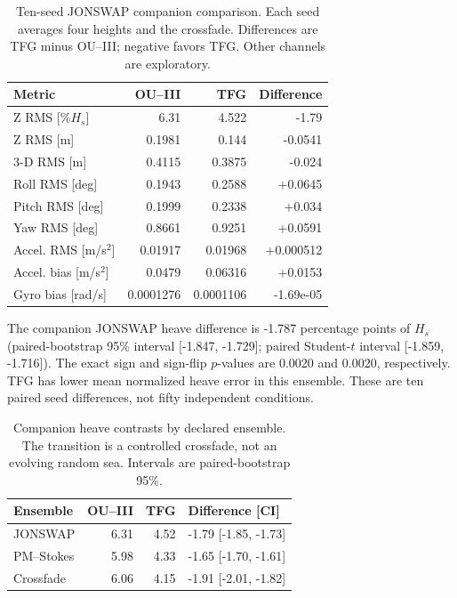 \begin{table}[t]\centering\footnotesize
\caption{Ten-seed JONSWAP companion comparison. Each seed averages four heights and the crossfade. Differences are TFG minus OU--III; negative favors TFG. Other channels are exploratory.}
\label{tab:tfg-paired}\setlength{\tabcolsep}{3pt}
\begin{tabular}{@{}lrrr@{}}\toprule
Metric & OU--III & TFG & Difference\\\midrule
Z RMS [$\%H_s$] & 6.31 & 4.522 & -1.79\\
Z RMS [m] & 0.1981 & 0.144 & -0.0541\\
3-D RMS [m] & 0.4115 & 0.3875 & -0.024\\
Roll RMS [deg] & 0.1943 & 0.2588 & +0.0645\\
Pitch RMS [deg] & 0.1999 & 0.2338 & +0.034\\
Yaw RMS [deg] & 0.8661 & 0.9251 & +0.0591\\
Accel. RMS [m/s$^2$] & 0.01917 & 0.01968 & +0.000512\\
Accel. bias [m/s$^2$] & 0.0479 & 0.06316 & +0.0153\\
Gyro bias [rad/s] & 0.0001276 & 0.0001106 & -1.69e-05\\
\bottomrule\end{tabular}\end{table}
The companion JONSWAP heave difference is -1.787 percentage points of $H_s$ (paired-bootstrap 95\% interval [-1.847, -1.729]; paired Student-$t$ interval [-1.859, -1.716]). The exact sign and sign-flip $p$-values are 0.0020 and 0.0020, respectively. TFG has lower mean normalized heave error in this ensemble.
These are ten paired seed differences, not fifty independent conditions.
\begin{table}[t]\centering\footnotesize
\caption{Companion heave contrasts by declared ensemble. The transition is a controlled crossfade, not an evolving random sea. Intervals are paired-bootstrap 95\%.}
\label{tab:tfg-ensembles}\setlength{\tabcolsep}{3pt}
\begin{tabular}{@{}lrrl@{}}\toprule
Ensemble & OU--III & TFG & Difference [CI]\\\midrule
JONSWAP & 6.31 & 4.52 & -1.79 [-1.85, -1.73]\\
PM--Stokes & 5.98 & 4.33 & -1.65 [-1.70, -1.61]\\
Crossfade & 6.06 & 4.15 & -1.91 [-2.01, -1.82]\\
\bottomrule\end{tabular}\end{table}
